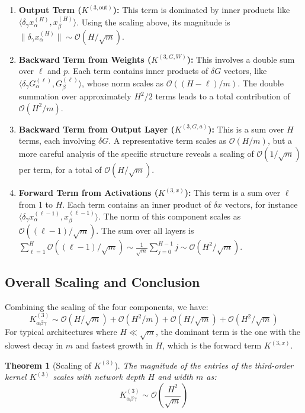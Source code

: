 \documentclass{article}
\newtheorem{theorem}{Theorem}[section]
\newcommand{\Order}{\mathcal{O}}
\begin{document}
\begin{enumerate}
    \item \textbf{Output Term ($K^{(3,\text{out})}$):} This term is dominated by inner products like $\langle \delta_\gamma x^{(H)}_\alpha, x^{(H)}_\beta \rangle$. Using the scaling above, its magnitude is $\|\delta_\gamma x^{(H)}_\alpha\| \sim \Order(H/\sqrt{m})$.

    \item \textbf{Backward Term from Weights ($K^{(3,G,W)}$):} This involves a double sum over $\ell$ and $p$. Each term contains inner products of $\delta G$ vectors, like $\langle \delta_\gamma G^{(\ell)}_\alpha, G^{(\ell)}_\beta \rangle$, whose norm scales as $\Order((H-\ell)/m)$. The double summation over approximately $H^2/2$ terms leads to a total contribution of $\Order(H^2/m)$.

    \item \textbf{Backward Term from Output Layer ($K^{(3,G,a)}$):} This is a sum over $H$ terms, each involving $\delta G$. A representative term scales as $\Order(H/m)$, but a more careful analysis of the specific structure reveals a scaling of $\Order(1/\sqrt{m})$ per term, for a total of $\Order(H/\sqrt{m})$.

    \item \textbf{Forward Term from Activations ($K^{(3,x)}$):} This term is a sum over $\ell$ from 1 to $H$. Each term contains an inner product of $\delta x$ vectors, for instance $\langle \delta_\gamma x^{(\ell-1)}_\alpha, x^{(\ell-1)}_\beta \rangle$. The norm of this component scales as $\Order((\ell-1)/\sqrt{m})$. The sum over all layers is $\sum_{\ell=1}^{H} \Order((\ell-1)/\sqrt{m}) \sim \frac{1}{\sqrt{m}} \sum_{j=0}^{H-1} j \sim \Order(H^2/\sqrt{m})$.
\end{enumerate}

\subsection{Overall Scaling and Conclusion}

Combining the scaling of the four components, we have:
\[
K^{(3)}_{\alpha\beta\gamma} \sim \Order(H/\sqrt{m}) + \Order(H^2/m) + \Order(H/\sqrt{m}) + \Order(H^2/\sqrt{m})
\]
For typical architectures where $H \ll \sqrt{m}$, the dominant term is the one with the slowest decay in $m$ and fastest growth in $H$, which is the forward term $K^{(3,x)}$.

\begin{theorem}[Scaling of $K^{(3)}$]
The magnitude of the entries of the third-order kernel $K^{(3)}$ scales with network depth $H$ and width $m$ as:
\begin{equation}
K^{(3)}_{\alpha\beta\gamma} \sim \Order\left(\frac{H^2}{\sqrt{m}}\right)
\end{equation}
\end{theorem}
\end{document}
